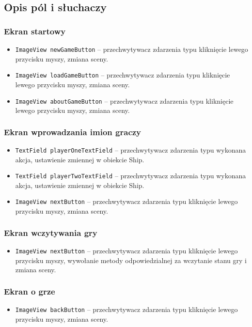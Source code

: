 \documentclass[a4paper]{article}
\newcommand{\prog}{\texttt}
\begin{document}
\subsection{Opis pól i słuchaczy}
\subsubsection{Ekran startowy}
\begin{itemize}
    \item \prog{ImageView newGameButton} -- przechwytywacz zdarzenia typu kliknięcie lewego przycisku myszy, zmiana sceny.
    \item \prog{ImageView loadGameButton} -- przechwytywacz zdarzenia typu kliknięcie lewego przycisku myszy, zmiana sceny.
    \item \prog{ImageView aboutGameButton} -- przechwytywacz zdarzenia typu kliknięcie lewego przycisku myszy, zmiana sceny.
\end{itemize}

\subsubsection{Ekran wprowadzania imion graczy}
\begin{itemize}
    \item \prog{TextField playerOneTextField} -- przechwytywacz zdarzenia typu wykonana akcja, ustawienie zmiennej w obiekcie Ship.
    \item \prog{TextField playerTwoTextField} -- przechwytywacz zdarzenia typu wykonana akcja, ustawienie zmiennej w obiekcie Ship.
    \item \prog{ImageView nextButton} -- przechwytywacz zdarzenia typu kliknięcie lewego przycisku myszy, zmiana sceny.
\end{itemize}

\subsubsection{Ekran wczytywania gry}
\begin{itemize}
    \item \prog{ImageView nextButton} -- przechwytywacz zdarzenia typu kliknięcie lewego przycisku myszy, wywołanie metody odpowiedzialnej za wczytanie stanu gry i zmiana sceny. 
\end{itemize}

\subsubsection{Ekran o grze}
\begin{itemize}
    \item \prog{ImageView backButton} -- przechwytywacz zdarzenia typu kliknięcie lewego przycisku myszy, zmiana sceny.
\end{itemize}
\end{document}
